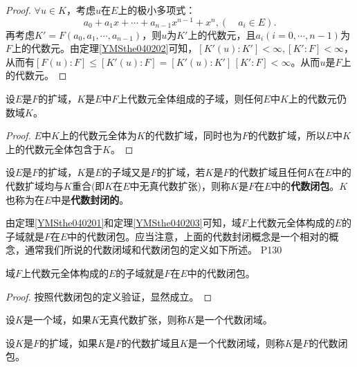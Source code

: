 \begin{proof}
	$\forall u\in K$，考虑$u$在$E$上的极小多项式：
	\begin{equation*}
		a_{0}+a_{1}x+\cdots+a_{n-1}x^{n-1}+x^{n},(\quad a_{i}\in E).
	\end{equation*}
	再考虑$K'=F(a_{0},a_{1},\cdots,a_{n-1})$，则$u$为$K'$上的代数元，且$a_{i}(i=0,\cdots,n-1)$为$F$上的代数元。由定理\ref{YMSthe040202}可知，$[K'(u):K']<\infty,[K':F]<\infty$，从而有$[F(u):F]\leq [K'(u):F]=[K'(u):K']\,[K':F]<\infty$。从而$u$是$F$上的代数元。
\end{proof}

\begin{corollary}
	设$E$是$F$的扩域，$K$是$E$中$F$上代数元全体组成的子域，则任何$E$中$K$上的代数元仍数域$K$。
\end{corollary}

\begin{proof}
	$E$中$K$上的代数元全体为$K$的代数扩域，同时也为$F$的代数扩域，所以$E$中$K$上的代数元全体包含于$K$。
\end{proof}

\begin{definition}\label{YMSdef040201}
	设$E$是$F$的扩域，$K$是$E$的子域又是$F$的扩域，若$K$是$F$的代数扩域且任何$K$在$E$中的代数扩域均与$K$重合(即$K$在$E$中无真代数扩张)，则称$K$是$F$在$E$中的\textbf{代数闭包}。$K$也称为在$E$中是\textbf{代数封闭的}。
\end{definition}

\original
{
	由定理\ref{YMSthe040201}和定理\ref{YMSthe040203}可知，域$F$上代数元全体构成的$E$的子域就是$F$在$E$中的代数闭包。应当注意，上面的代数封闭概念是一个相对的概念，通常我们所说的代数闭域和代数闭包的定义如下所述。
}
{P130}

\begin{proposition}
	域$F$上代数元全体构成的$E$的子域就是$F$在$E$中的代数闭包。
\end{proposition}

\begin{proof}
	按照代数闭包的定义验证，显然成立。
\end{proof}

\begin{definition}\label{YMSdef040202}
	设$K$是一个域，如果$K$无真代数扩张，则称$K$是一个代数闭域。
\end{definition}

\begin{definition}\label{YMSdef040203}
	设$K$是$F$的扩域，如果$K$是$F$的代数扩域且$K$是一个代数闭域，则称$K$是$F$的代数闭包。
\end{definition}

